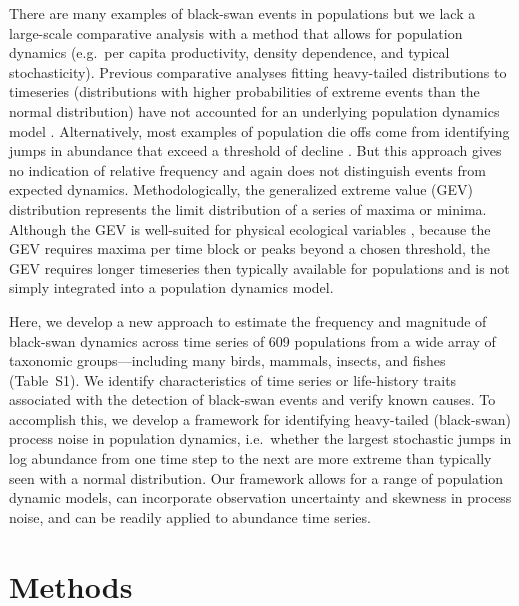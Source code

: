 There are many examples of black-swan events in populations
but we lack a large-scale comparative analysis
with a method that allows for
population dynamics
(e.g.\ per capita productivity, density dependence, and typical stochasticity).
Previous comparative analyses fitting
heavy-tailed distributions to timeseries
(distributions with higher probabilities of extreme events
than the normal distribution)
have not accounted for an underlying population dynamics model
\citep{keitt1998, allen2001, halley2002, segura2013}.
Alternatively, most examples of population die offs come from identifying
jumps in abundance that exceed a threshold of decline
\citep[e.g.][]{young1994, gerber2001, reed2003, fey2015}.
But this approach gives no indication of relative frequency
and again does not distinguish events from
expected dynamics.
Methodologically, the generalized extreme value (GEV) distribution represents
the limit distribution of a series of maxima or minima.
Although the GEV is well-suited for physical ecological variables
\citep[e.g.\ sedimentation rates or wind speeds;][]{gaines1993, denny2009},
because the GEV requires maxima per time block
or peaks beyond a chosen threshold,
the GEV requires longer timeseries then typically available
for populations and is not simply integrated
into a population dynamics model.

Here, we develop a new approach to estimate the frequency and magnitude of
black-swan dynamics across time series of 609 populations from a wide array of
taxonomic groups---including many  birds, mammals, insects, and fishes
(Table~S1). We identify characteristics of time series or
life-history traits associated with the detection of black-swan events and
verify known causes. To accomplish this, we develop a framework for identifying
heavy-tailed (black-swan) process noise in population dynamics, i.e.~whether
the largest stochastic jumps in log abundance from one time step to the next
are more extreme than typically seen with a normal distribution. Our framework
allows for a range of population dynamic models, can incorporate observation
uncertainty and skewness in process noise, and can be readily applied to
abundance time series.

\section{Methods}

